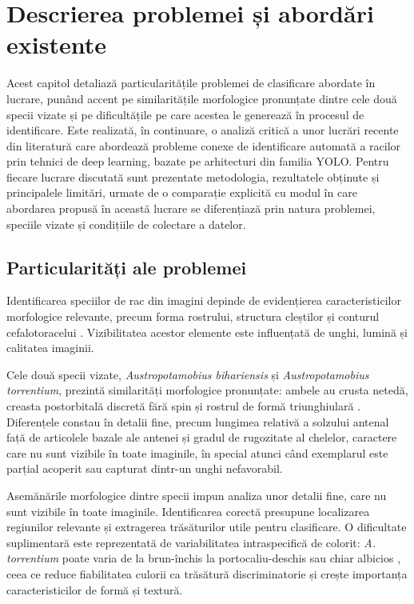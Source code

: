 \chapter{Descrierea problemei și abordări existente}\label{chapter:cap3} %

Acest capitol detaliază particularitățile problemei de clasificare abordate în lucrare, punând accent pe similaritățile morfologice pronunțate dintre cele două specii vizate și pe dificultățile pe care acestea le generează în procesul de identificare. Este realizată, în continuare, o analiză critică a unor lucrări recente din literatură care abordează probleme conexe de identificare automată a racilor prin tehnici de deep learning, bazate pe arhitecturi din familia YOLO. Pentru fiecare lucrare discutată sunt prezentate metodologia, rezultatele obținute și principalele limitări, urmate de o comparație explicită cu modul în care abordarea propusă în această lucrare se diferențiază prin natura problemei, speciile vizate și condițiile de colectare a datelor.

\section{Particularități ale problemei}

Identificarea speciilor de rac din imagini depinde de evidențierea caracteristicilor morfologice relevante, precum forma rostrului, structura cleștilor și conturul cefalotoracelui \cite{parvulescu2009}. Vizibilitatea acestor elemente este influențată de unghi, lumină și calitatea imaginii.

Cele două specii vizate, \textit{Austropotamobius bihariensis} și \textit{Austropotamobius torrentium}, prezintă similarități morfologice pronunțate: ambele au crusta netedă, creasta postorbitală discretă fără spin și rostrul de formă triunghiulară \cite{parvulescu2009}. Diferențele constau în detalii fine, precum lungimea relativă a solzului antenal față de articolele bazale ale antenei și gradul de rugozitate al chelelor, caractere care nu sunt vizibile în toate imaginile, în special atunci când exemplarul este parțial acoperit sau capturat dintr-un unghi nefavorabil.

Asemănările morfologice dintre specii impun analiza unor detalii fine, care nu sunt vizibile în toate imaginile. Identificarea corectă presupune localizarea regiunilor relevante și extragerea trăsăturilor utile pentru clasificare. O dificultate suplimentară este reprezentată de variabilitatea intraspecifică de colorit: \textit{A. torrentium} poate varia de la brun-închis la portocaliu-deschis sau chiar albicios \cite{parvulescu2009}, ceea ce reduce fiabilitatea culorii ca trăsătură discriminatorie și crește importanța caracteristicilor de formă și textură.


